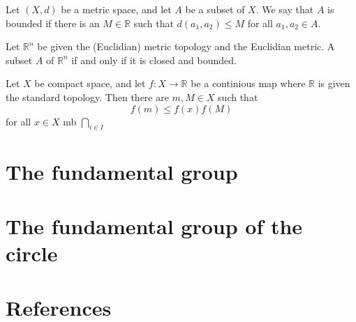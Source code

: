 \documentclass{article}
\theoremstyle{remark}
\begin{document}
\begin{definition}

    Let $\left( X,d \right) $ be a metric space, and let $A$ be a subset of $X$. We say that $A$ is bounded if there is
    an $M  \in  \mathbb{R} $ such that $d\left( a_{1}, a_{2} \right) \le M$ for all $a_{1}, a_{2} \in  A$.

\end{definition}

\begin{theorem}
    Let $\mathbb{R} ^{n}$ be given the (Euclidian) metric topology and the Euclidian metric. A subset $A$ of $\mathbb{R}
    ^{n}$ if and only if it is closed and bounded.

\end{theorem}


\begin{theorem}

    Let $X$ be compact space, and let $f: X \to  \mathbb{R} $ be a continious map where $ \mathbb{R} $ is given the
    standard topology.  Then there are $m, M \in X $ such that \[
    f\left( m \right) \le f\left( x \right) f\left( M \right)
    \]
    for all $x \in   X$
    \textbf{}
    mb
    $\bigcap_{i \in  I}^{} $
\end{theorem}
\section{ The fundamental group}%
\label{sec:the_fundamental_group}




\section{ The fundamental group of the circle}%
\label{sec:the_fundamental_group_of_the_circle}




\newpage
\section{References}%
\label{sec:references}



\end{document}
